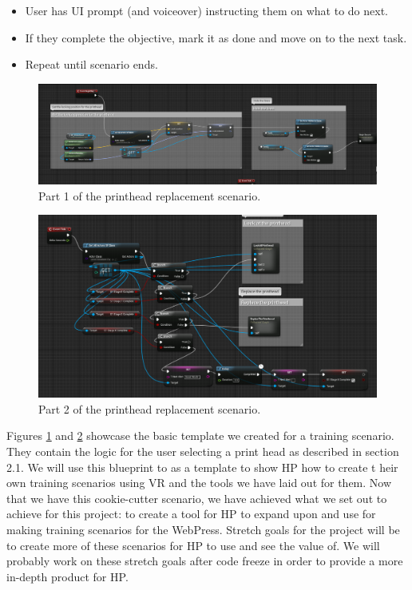 \documentclass[onecolumn, draftclsnofoot,10pt, compsoc]{IEEEtran}
\begin{document}
\begin{itemize}
    \item User has UI prompt (and voiceover) instructing them on what to do next.
    \item If they complete the objective, mark it as done and move on to the next task.
    \item Repeat until scenario ends.
\end{itemize}
\newpage
\begin{figure}[ht!]
    \centering
    \includegraphics[scale=0.45]{scenario_bp1.png}
    \caption{Part 1 of the printhead replacement scenario.}
    \label{fig:scanerio1}
\end{figure}

\begin{figure}[ht!]
    \centering
    \includegraphics[scale=0.45]{scenario_bp2.png}
    \caption{Part 2 of the printhead replacement scenario.}
    \label{fig:scanerio2}
\end{figure}
\noindent
Figures \ref{fig:scanerio1} and \ref{fig:scanerio2} showcase the basic template we created for a training scenario. They contain the logic for the user selecting a print head as described in section 2.1. We will use this blueprint to as a template to show HP how to create t heir own training scenarios using VR and the tools we have laid out for them. Now that we have this cookie-cutter scenario, we have achieved what we set out to achieve for this project: to create a tool for HP to expand upon and use for making training scenarios for the WebPress. Stretch goals for the project will be to create more of these scenarios for HP to use and see the value of. We will probably work on these stretch goals after code freeze in order to provide a more in-depth product for HP.
\end{document}
